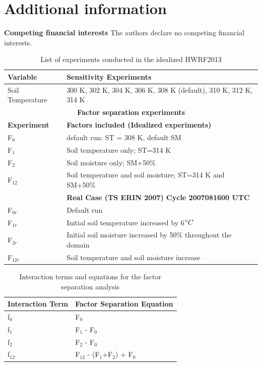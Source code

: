 \documentclass[fleqn,10pt]{wlscirep}
\begin{document}
\section*{Additional information}
\textbf{Competing financial interests}
The authors declare no competing financial interests.

\begin{table}[ht]
\centering
\begin{tabular}{|l|l|}
\hline
\textbf{Variable} & \textbf{Sensitivity Experiments} \\
\hline
Soil Temperature & 300 K, 302 K, 304 K, 306 K, 308 K (default), 310 K, 312 K, 314 K \\
\hline
\multicolumn{2}{c}{\textbf{Factor separation experiments}} \\
\hline
\textbf{Experiment} & \textbf{Factors included (Idealized experiments)}\\
\hline
F$_{0}$ & default run: ST = 308 K, default SM \\
\hline
F$_{1}$ & Soil temperature only; ST=314 K \\
\hline
F$_{2}$ & Soil moisture only; SM+50\% \\
\hline
F$_{12}$ & Soil temperature and soil moisture; ST=314 K and SM+50\% \\
\hline
 & \textbf{Real Case (TS ERIN 2007) Cycle 2007081600 UTC} \\
 \hline
 F$_{0r}$ & Default run \\
 \hline
 F$_{1r}$ & Initial soil temperature increased by 6$\degree{C}$ \\
 \hline
 F$_{2r}$ & Initial soil moisture increased by 50\% throughout the domain \\
 \hline
 F$_{12r}$ & Soil temperature and soil moisture increase \\
 \hline
\end{tabular}
\caption{List of experiments conducted in the idealized HWRF2013}
\label{tab:exp_list}
\end{table}

\begin{table}[ht]
\centering
\begin{tabular}{|l|l|}
\hline
\textbf{Interaction Term} & \textbf{Factor Separation Equation} \\
\hline
f$_{0}$ & F$_{0}$ \\
\hline
f$_{1}$ & F$_{1}$ - F$_{0}$ \\
\hline
f$_{2}$ & F$_{2}$ - F$_{0}$ \\
\hline
f$_{12}$ & F$_{12}$ - (F$_{1}$+F$_{2}$) + F$_{0}$ \\
\hline
\end{tabular}
\caption{Interaction terms and equations for the factor separation analysis}
\label{tab:facsep}
\end{table}
\end{document}
